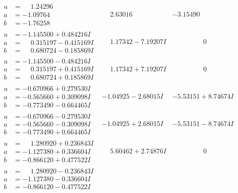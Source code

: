 \documentclass[1p]{elsarticle_modified}
\theoremstyle{definition}
\begin{document}
$$\begin{array}{c|c|c}
\begin{aligned}
u &= \phantom{-}1.24296\phantom{ +0.000000I} \\
a &= -1.09764\phantom{ +0.000000I} \\
b &= -1.76258\phantom{ +0.000000I}\end{aligned}
 & \phantom{-}2.63016\phantom{ +0.000000I} & -3.15490\phantom{ +0.000000I} \\ \hline\begin{aligned}
u &= -1.145500 + 0.484216 I \\
a &= \phantom{-}0.315197 - 0.415169 I \\
b &= \phantom{-}0.680724 - 0.185869 I\end{aligned}
 & \phantom{-}1.17342 - 7.19207 I & \phantom{-0.000000 } 0 \\ \hline\begin{aligned}
u &= -1.145500 - 0.484216 I \\
a &= \phantom{-}0.315197 + 0.415169 I \\
b &= \phantom{-}0.680724 + 0.185869 I\end{aligned}
 & \phantom{-}1.17342 + 7.19207 I & \phantom{-0.000000 } 0 \\ \hline\begin{aligned}
u &= -0.670966 + 0.279530 I \\
a &= -0.565660 + 0.309098 I \\
b &= -0.773490 - 0.664465 I\end{aligned}
 & -1.04925 - 2.68015 I & -5.53151 + 8.74674 I \\ \hline\begin{aligned}
u &= -0.670966 - 0.279530 I \\
a &= -0.565660 - 0.309098 I \\
b &= -0.773490 + 0.664465 I\end{aligned}
 & -1.04925 + 2.68015 I & -5.53151 - 8.74674 I \\ \hline\begin{aligned}
u &= \phantom{-}1.280920 + 0.236843 I \\
a &= -1.127380 + 0.336604 I \\
b &= -0.866120 + 0.477522 I\end{aligned}
 & \phantom{-}5.60462 + 2.74876 I & \phantom{-0.000000 } 0 \\ \hline\begin{aligned}
u &= \phantom{-}1.280920 - 0.236843 I \\
a &= -1.127380 - 0.336604 I \\
b &= -0.866120 - 0.477522 I\end{aligned}

\end{array}$$
\end{document}
